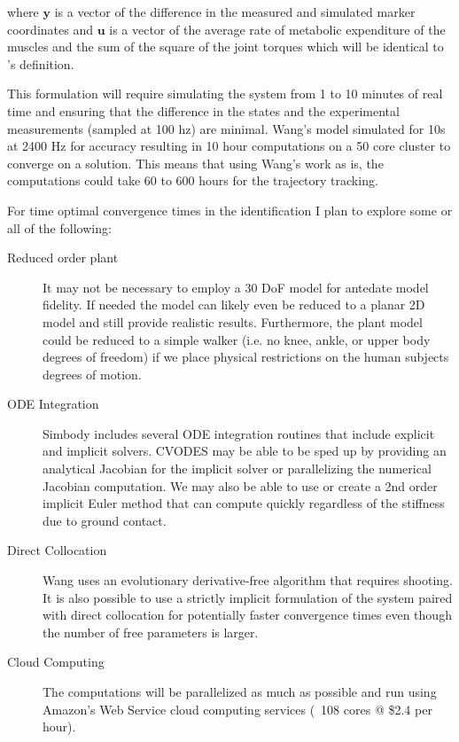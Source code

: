 \documentclass[11pt]{article}
\begin{document}
where $\mathbf{y}$ is a vector of the difference in the measured and simulated
marker coordinates and $\mathbf{u}$ is a vector of the average rate of
metabolic expenditure of the muscles and the sum of the square of the joint
torques which will be identical to \cite{Wang2012}'s definition.

This formulation will require simulating the system from 1 to 10 minutes of
real time and ensuring that the difference in the states and the experimental
measurements (sampled at 100 hz) are minimal. Wang's model simulated for 10s at
2400 Hz for accuracy resulting in 10 hour computations on a 50 core cluster to
converge on a solution. This means that using Wang's work as is, the
computations could take 60 to 600 hours for the trajectory tracking.

For time optimal convergence times in the identification I plan to explore some
or all of the following:

\begin{description}
  \item[Reduced order plant] It may not be necessary to employ a 30 DoF model
    for antedate model fidelity. If needed the model can likely even be reduced
    to a planar 2D model and still provide realistic results. Furthermore, the
    plant model could be reduced to a simple walker (i.e. no knee, ankle, or
    upper body degrees of freedom) if we place physical restrictions on the
    human subjects degrees of motion.
  \item[ODE Integration] Simbody includes several ODE integration routines that
    include explicit and implicit solvers. CVODES may be able to be sped up by
    providing an analytical Jacobian for the implicit solver or parallelizing the
    numerical Jacobian computation. We may also be able to use or create a 2nd
    order implicit Euler method that can compute quickly regardless of the
    stiffness due to ground contact.
  \item[Direct Collocation] Wang uses an evolutionary derivative-free
    algorithm that requires shooting. It is also possible to use a strictly
    implicit formulation of the system paired with direct collocation for
    potentially faster convergence times even though the number of free
    parameters is larger.
  \item[Cloud Computing] The computations will be parallelized as much as
    possible and run using Amazon's Web Service cloud computing services (~108
    cores @ \$2.4 per hour).
\end{description}
\end{document}
